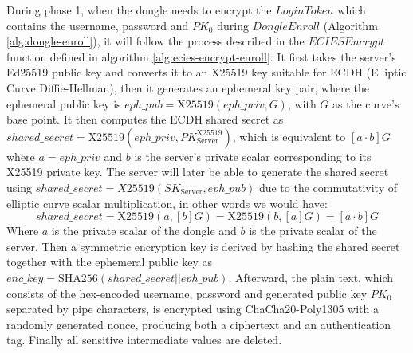 During phase 1, when the dongle needs to encrypt the $LoginToken$ which contains the username, password and $PK_0$ during $DongleEnroll$ (Algorithm \ref{alg:dongle-enroll}), it will follow the process described in the $ECIESEncrypt$ function defined in algorithm \ref{alg:ecies-encrypt-enroll}. It first takes the server's Ed25519 public key and converts it to an X25519 key suitable for ECDH (Elliptic Curve Diffie-Hellman), then it generates an ephemeral key pair, where the ephemeral public key is $eph\_pub=\text{X25519}(eph\_priv,G)$, with $G$ as the curve's base point. It then computes the ECDH shared secret as $shared\_secret=\text{X25519}(eph\_priv, PK_{\text{Server}}^{\text{X25519}})$, which is equivalent to $[a \cdot b]G$ where $a=eph\_priv$ and $b$ is the server's private scalar corresponding to its X25519 private key. The server will later be able to generate the shared secret using $shared\_secret=X25519(SK_{\text{Server}}, eph\_pub)$ due to the commutativity of elliptic curve scalar multiplication, in other words we would have:
$$
shared\_secret=\text{X25519}(a, [b]G) = \text{X25519}(b, [a]G) = [a \cdot b]G
$$
Where $a$ is the private scalar of the dongle and $b$ is the private scalar of the server.
Then a symmetric encryption key is derived by hashing the shared secret together with the ephemeral public key as $enc\_key=\text{SHA256}(shared\_secret||eph\_pub)$. Afterward, the plain text, which consists of the hex-encoded username, password and generated public key $PK_0$ separated by pipe characters, is encrypted using ChaCha20-Poly1305 with a randomly generated nonce, producing both a ciphertext and an authentication tag. Finally all sensitive intermediate values are deleted.

